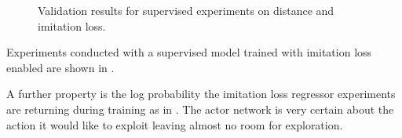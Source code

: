 \begin{figure}
    \begin{center}
        \hfill
    \end{center}
    \caption[Supervised Distance and Imitation Loss]{Validation results for supervised experiments on distance and imitation loss. }
    \label{fig:sac_supervised_imitation}
\end{figure}

Experiments conducted with a supervised model trained with imitation loss enabled are shown in .

A further property is the log probability the imitation loss regressor experiments are returning during training as in . The actor network is very certain about the action it would like to exploit leaving almost no room for exploration. 